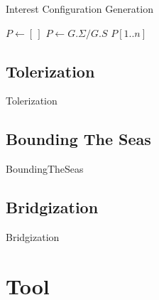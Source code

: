 \documentclass[10pt,nocc]{xrese_report}
\begin{document}
\begin{algorithm}[tb]
 \caption{Interest Configuration Generation}\label{alg:interest}

 \begin{algorithmic}[1]
   \State $P \longleftarrow [\,]$
   \State $P \longleftarrow G.\Sigma / G.S$
   \State {}
   \State \Return $P[1..n]$
   \EndProcedure
 \end{algorithmic}
\end{algorithm}

\section{Tolerization}

\begin{algorithm}
 \caption{Tolerization}
 \begin{algorithmic}[1]
  
  \EndProcedure
 \end{algorithmic}

\end{algorithm}

\section{Bounding The Seas}

\begin{algorithm}
 \caption{BoundingTheSeas}
 \begin{algorithmic}[1]
  
  \EndProcedure
 \end{algorithmic}

\end{algorithm}

\section{Bridgization}

\begin{algorithm}
 \caption{Bridgization}
 \begin{algorithmic}[1]
  
  \EndProcedure
 \end{algorithmic}

\end{algorithm}

\chapter{Tool}
\end{document}
